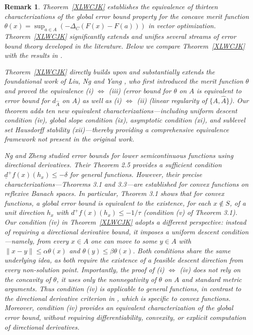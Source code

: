 \documentclass[11pt]{article}
\newtheorem{remark}{Remark}[section]
\begin{document}
 \begin{remark}   		Theorem~\ref{XLWCJK} establishes the equivalence of thirteen characterizations of the global error bound property for the concave merit function \(\theta(x)=\sup_{a\in A}(-\Delta_C(F(x)-F(a)))\) in vector optimization. Theorem~\ref{XLWCJK} significantly extends and unifies several streams of error bound theory developed in the literature. Below we compare Theorem~\ref{XLWCJK} with the results in   \cite{LiuNgYang2009, NgZheng, KL1999, NgYang2002, AC2004, Kruger, KLT2018}.
 		
 Theorem~\ref{XLWCJK} directly builds upon and substantially extends the foundational work of Liu, Ng and Yang   \cite{LiuNgYang2009}, who first introduced the merit function \(\theta\) and proved the equivalence (i) \(\Leftrightarrow\) (iii) (error bound for \(\theta\) on \(A\) is equivalent to error bound for \(d_{\widehat A}\) on \(A\)) as well as (i) \(\Leftrightarrow\) (ii) (linear regularity of \(\{A,\widehat A\}\)). Our theorem adds ten new equivalent characterizations---including uniform descent condition (iv), global slope condition (ix), asymptotic condition (xi), and sublevel set Hausdorff stability (xii)---thereby providing a comprehensive equivalence framework not present in the original work.
 		
 
 
 Ng and Zheng \cite{NgZheng} studied error bounds for lower semicontinuous functions using directional derivatives. Their Theorem 2.5 provides a sufficient condition \(\underline{d}^+f(x)(h_x)\le -\delta\) for general functions. However, their precise characterizations—Theorems 3.1 and 3.3—are established for convex functions on reflexive Banach spaces. In particular, Theorem 3.1 shows that for convex functions, a global error bound is equivalent to the existence, for each \(x\notin S\), of a unit direction \(h_x\) with \(d^+f(x)(h_x)\le -1/\tau\) (condition (v) of Theorem 3.1). Our condition (iv) in Theorem~\ref{XLWCJK} adopts a different perspective: instead of requiring a directional derivative bound, it imposes a uniform descent condition—namely, from every \(x\in A\) one can move to some \(y\in A\) with \(\|x-y\|\le \alpha\theta(x)\) and \(\theta(y)\le \beta\theta(x)\).    Both conditions share the same underlying idea, as both require the existence of a feasible descent direction from every non-solution point.         Importantly, the proof of  (i) $\Leftrightarrow$ (iv) does not rely on the concavity   of \(\theta\),  it uses only the nonnegativity of \(\theta\) on \(A\) and standard metric arguments. Thus condition (iv) is applicable to general functions, in contrast to the directional derivative criterion in \cite{NgZheng}, which is specific to convex functions.  Moreover,  condition (iv) provides an equivalent characterization of the global error bound, without requiring differentiability, convexity, or explicit computation of directional derivatives.
 

\end{remark}
\end{document}

